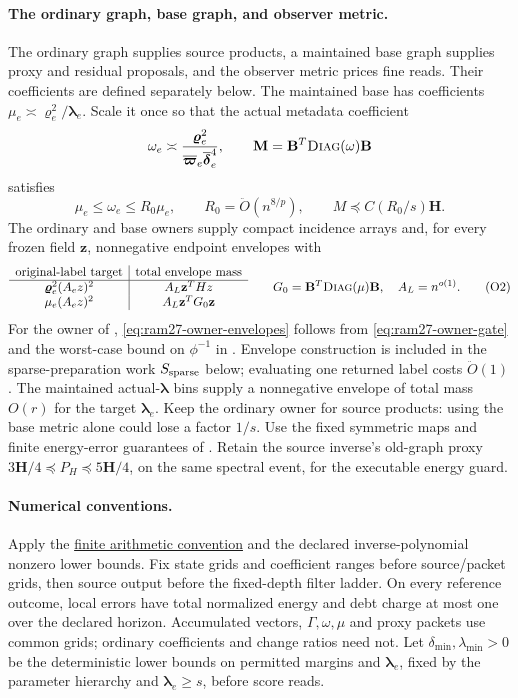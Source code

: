 \documentclass[11pt]{article}
\theoremstyle{remark}
\newcommand{\BB}{\mathbf B}
\newcommand{\HH}{\mathbf H}
\newcommand{\llambda}{\boldsymbol{\lambda}}
\newcommand{\zz}{\mathbf z}
\newcommand{\vvr}{\boldsymbol{\varrho}}
\newcommand{\vvpbar}{\overline{\boldsymbol{\varpi}}}
\newcommand{\MM}{\mathbf M}
\newcommand{\ddeltabar}{\overline{\boldsymbol{\delta}}}
\newcommand{\diag}{\textsc{Diag}}
\renewcommand{\O}{\ddot{O}}
\begin{document}
\paragraph{The ordinary graph, base graph, and observer metric.}
The ordinary graph supplies source products, a maintained base graph supplies
proxy and residual proposals, and the observer metric prices fine reads.
Their coefficients are defined separately below.
The maintained base has coefficients $\mu_e\asymp \vvr_e^2/\llambda_e$.
Scale it once so that the actual metadata coefficient
\[
 \omega_e\asymp\frac{\vvr_e^2}{\vvpbar_e\ddeltabar_e^4},\qquad
 \MM=\BB^T\diag(\omega)\BB
\]
satisfies
\begin{equation}\label{eq:ram27-base}
 \mu_e\le\omega_e\le R_0\mu_e,\qquad
 R_0=\O(n^{8/p}),\qquad
 M\preceq C(R_0/s)\HH .
\end{equation}
The ordinary and base owners supply compact incidence arrays and, for every
frozen field $\zz$, nonnegative endpoint envelopes with
\[
 \begin{array}{c|c}
 \text{original-label target}&\text{total envelope mass}\\ \hline
 \vvr_e^2(A_ez)^2&A_L \zz^THz\\
 \mu_e(A_ez)^2&A_L \zz^TG_0\zz
 \end{array}
 \qquad
 G_0=\BB^T\diag(\mu)\BB,\quad A_L=n^{o(1)}.
                                                               \tag{O2}\label{eq:ram27-owner-envelopes}
\]
For the owner of , \eqref{eq:ram27-owner-envelopes}
follows from \eqref{eq:ram27-owner-gate} and the worst-case bound on $\phi^{-1}$
in .
Envelope construction is included in the sparse-preparation work $S_{\rm
sparse}$ below; evaluating one returned label costs $\O(1)$.
The maintained actual-$\llambda$ bins supply a nonnegative envelope of total mass
$O(r)$ for the target $\llambda_e$.
Keep the ordinary owner for source products: using the base metric alone could
lose a factor $1/s$.
Use the fixed symmetric maps and finite energy-error guarantees of
.
Retain the source inverse's old-graph proxy $3\HH/4\preceq P_H\preceq5\HH/4$, on the
same spectral event, for the executable energy guard.

\paragraph{Numerical conventions.}
Apply the \hyperref[par:ram30-finite-arithmetic]{finite arithmetic convention}
and the declared inverse-polynomial nonzero lower bounds.
Fix state grids and coefficient ranges before source/packet grids, then source
output before the fixed-depth filter ladder.
On every reference outcome, local errors have total normalized energy and debt
charge at most one over the declared horizon.
Accumulated vectors, $\Gamma,\omega,\mu$ and proxy packets use common grids;
ordinary coefficients and change ratios need not.
Let $\delta_{\min},\lambda_{\min}>0$ be the deterministic lower bounds on
permitted margins and $\llambda_e$, fixed by the parameter hierarchy and
$\llambda_e\ge s$, before score reads.
\end{document}
